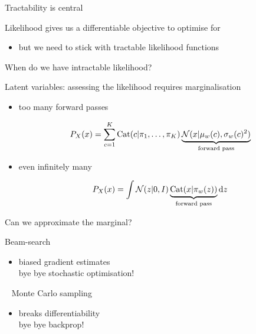 \documentclass[14pt]{beamer}
\begin{document}
\begin{frame}{Tractability is central}

Likelihood gives us a differentiable objective to optimise for
\begin{itemize}
	\item but we need to stick with \alert{tractable} likelihood functions
\end{itemize}




\end{frame}

\begin{frame}{When do we have intractable likelihood?}

Latent variables: assessing the likelihood requires marginalisation
\begin{itemize}
	\item too many forward passes
	\begin{small}
	\begin{equation*}
	P_X(x) = \sum_{c=1}^K \operatorname{Cat}(c|\pi_1, \ldots, \pi_K) \underbrace{\mathcal N(x|\mu_w(c), \sigma_w(c)^2)}_{\text{forward pass}}
	\end{equation*}
	\end{small}
	\pause
	\item even infinitely many
	\begin{small}
	\begin{equation*}
	P_X(x) = \int \mathcal N(z|0, I) \underbrace{\operatorname{Cat}(x|\pi_w(z))}_{\text{forward pass}} \mathrm{d}z
	\end{equation*}
	\end{small}
\end{itemize}

\end{frame}


\begin{frame}{Can we approximate the marginal?}

Beam-search %
\begin{itemize}
	\item \alert{biased gradient estimates}\\
	bye bye stochastic optimisation!
\end{itemize}

~
\pause
Monte Carlo sampling
\begin{itemize}
	\item \alert{breaks differentiability}\\
	bye bye backprop!
\end{itemize}

\end{frame}
\end{document}
